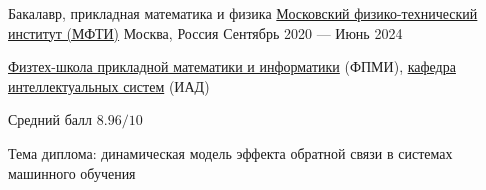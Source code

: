 \begin{cventries}
  \cventry
    {Бакалавр, прикладная математика и физика} %
    {\href{https://en.wikipedia.org/wiki/Moscow_Institute_of_Physics_and_Technology}{Московский физико-технический институт (МФТИ)}} %
    {Москва, Россия} %
    {Сентябрь 2020 — Июнь 2024} %
    {
      \begin{cvitems}
        \item {\href{https://pk.mipt.ru/schools/fpmi/}{Физтех-школа прикладной математики и информатики} (ФПМИ), \href{https://intsystems.github.io}{кафедра интеллектуальных систем} (ИАД)}
        \item {Средний балл $8.96/10$}
        \item {Тема диплома: динамическая модель эффекта обратной связи в системах машинного обучения}
      \end{cvitems}
    }

\end{cventries}
